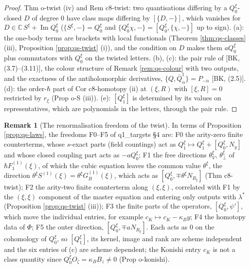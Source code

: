 \documentclass[11pt]{article}
\numberwithin{equation}{section}
\theoremstyle{plain}
\theoremstyle{definition}
\newtheorem{remark}[theorem]{Remark}
\begin{document}
\begin{proof}
Thm o-twist (iv) and Rem c8-twist: two quantisations differing by a $Q^\xi_0$-closed $D$ of degree $0$ have class maps differing by $[\{D,-\}]$, which vanishes for $D\in\mathbb C\,S^\xi+\operatorname{Im}Q^\xi_0$ ($\{S^\xi,-\}=Q^\xi_0$ and $\{Q^\xi_0\chi,-\}=[Q^\xi_0,\{\chi,-\}]$ up to sign). (a): the one-body terms are brackets with local functionals (Theorem \ref{thm:qs-classes} (iii), Proposition \ref{prop:qs-twist} (i)), and the condition on $D$ makes them $aQ^\xi_0$ plus commutators with $Q^\xi_0$ on the twisted letters. (b), (c): the pair rule of [BK, (3.7)--(3.11)], the colour structure of Remark \ref{rem:qs-colour} with two outputs, and the exactness of the antiholomorphic derivatives, $\{Q,\bar Q^1_{\dot\alpha}\}=P_{-\dot\alpha}$ [BK, (2.5)]. (d): the order-$\hbar$ part of Cor c8-homotopy (ii) at $(\xi,R)$ with $[\xi,R]=0$ restricted by $r_\xi$ (Prop o-S (iii)). (e): $[Q^\xi_1]$ is determined by its values on representatives, which are polynomials in the letters, through the pair rule.
\end{proof}

\begin{remark}[The renormalisation freedom of the twist]
\label{rem:qs-twistfreedom}
In terms of Proposition \ref{prop:qs-laws}, the freedoms F0--F5 of q1\_targets §4 are: F0 the arity-zero finite counterterms, whose $s$-exact parts (field countings) act as $Q^\xi_1\mapsto Q^\xi_1+[Q^\xi_0,N_y]$ and whose closed coupling part acts as $-aQ^\xi_0$; F1 the free directions $\theta^\xi_V$, $\theta^\xi_\perp$ of $\hbar F_1^{(1)}(\xi)$, of which the cubic equation leaves the common value $\theta^\xi$, the direction $\theta^\xi S^{(1)}(\xi)=\theta^\xi G_B^{(1)}(\xi)$, which acts as $[Q^\xi_0,\mp\theta^\xi N_{R_\xi}]$ (Thm c8-twist); F2 the arity-two finite counterterm along $(\xi,\xi)$, correlated with F1 by the $(\xi,\xi)$ component of the master equation and entering only outputs with $\lambda^*$ (Proposition \ref{prop:qs-twist} (iii)); F3 the finite parts of the operators, $[Q^\xi_0,\psi']$, which move the individual entries, for example $c_K\mapsto c_K-\kappa_By$; F4 the homotopy data of $\Phi$; F5 the outer direction, $[Q^\xi_0,\mp aN_{R_\xi}]$. Each acts as $0$ on the cohomology of $Q^\xi_0$, so $[Q^\xi_1]$, its kernel, image and rank are scheme independent and the six entries of (c) are scheme dependent; the Konishi entry $c_K$ is not a class quantity since $Q^\xi_0O_\zeta=\kappa_BB_z\neq0$ (Prop o-konishi).
\end{remark}
\end{document}
